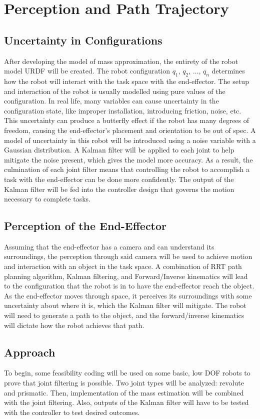 \section{Perception and Path Trajectory}
\subsection{Uncertainty in Configurations}
After developing the model of mass approximation, the entirety of the robot model URDF will be created. The robot configuration $q_1$, $q_2$, ..., $q_n$ determines how the robot will interact with the task space with the end-effector.  The setup and interaction of the robot is usually modelled using pure values of the configuration.  In real life, many variables can cause uncertainty in the configuration state, like improper installation, introducing friction, noise, etc.  This uncertainty can produce a butterfly effect if the robot has many degrees of freedom, causing the end-effector's placement and orientation to be out of spec.  A model of uncertainty in this robot will be introduced using a noise variable with a Gaussian distribution.  A Kalman filter will be applied to each joint to help mitigate the noise present, which gives the model more accuracy.  As a result, the culmination of each joint filter means that controlling the robot to accomplish a task with the end-effector can be done more confidently.  The output of the Kalman filter will be fed into the controller design that governs the motion necessary to complete tasks.

\subsection{Perception of the End-Effector}
Assuming that the end-effector has a camera and can understand its surroundings, the perception through said camera will be used to achieve motion and interaction with an object in the task space.  A combination of RRT path planning algorithm, Kalman filtering, and Forward/Inverse kinematics will lead to the configuration that the robot is in to have the end-effector reach the object.  As the end-effector moves through space, it perceives its surroundings with some uncertainty about where it is, which the Kalman filter will mitigate.  The robot will need to generate a path to the object, and the forward/inverse kinematics will dictate how the robot achieves that path.

\subsection{Approach}
To begin, some feasibility coding will be used on some basic, low DOF robots to prove that joint filtering is possible.  Two joint types will be analyzed: revolute and prismatic.  Then, implementation of the mass estimation will be combined with the joint filtering.  Also, outputs of the Kalman filter will have to be tested with the controller to test desired outcomes.

